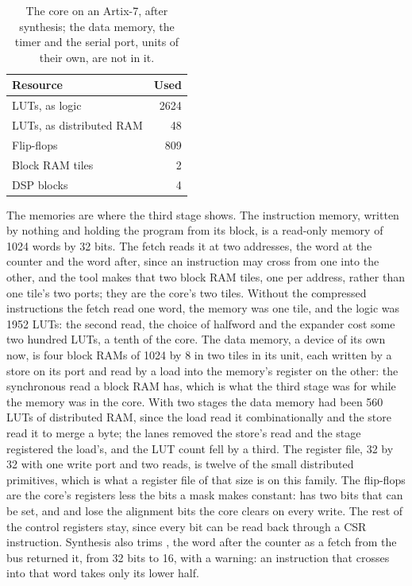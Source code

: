 \documentclass[journal,onecolumn,9pt]{IEEEtran}
\begin{document}
\begin{table}[htbp]
\caption{The core on an Artix-7, after synthesis; the data memory,
the timer and the serial port, units of their own, are not in it.}
\label{tab:v-synth}
\centering
\begin{tabular}{@{}lr@{}}
\toprule
Resource & Used \\
\midrule
LUTs, as logic & 2624 \\
LUTs, as distributed RAM & 48 \\
Flip-flops & 809 \\
Block RAM tiles & 2 \\
DSP blocks & 4 \\
\bottomrule
\end{tabular}
\end{table}

The memories are where the third stage shows. The instruction
memory, written by nothing and holding the program from its
 block, is a read-only memory of 1024 words by 32 bits.
The fetch reads it at two addresses, the word at the counter and the
word after, since an instruction may cross from one into the other,
and the tool makes that two block RAM tiles, one per address, rather
than one tile's two ports; they are the core's two tiles. Without the
compressed instructions the fetch read one word, the memory was one
tile, and the logic was 1952 LUTs: the second read, the choice of
halfword and the expander cost some two hundred LUTs, a tenth of the
core. The data memory, a
device of its own now, is four block RAMs of 1024 by 8 in two tiles
in its unit, each written by a store on its port and read by a load
into the memory's register on the other: the synchronous read a
block RAM has, which is what the third stage was for while the
memory was in the core. With two stages the data memory had been
560 LUTs of
distributed RAM, since the load read it combinationally and the
store read it to merge a byte; the lanes removed the store's read
and the stage registered the load's, and the LUT count fell by a
third. The register file, 32 by 32 with one write port and two
reads, is twelve of the small distributed primitives, which is what
a register file of that size is on this family. The flip-flops are
the core's registers less the bits a mask makes constant:  has two bits that
can be set, and  and  lose the alignment
bits the core clears on every write. The rest of the control
registers stay, since every bit can be read back through a CSR
instruction. Synthesis also
trims , the word after the counter as a fetch from the
bus returned it, from 32 bits to 16, with a warning: an instruction
that crosses into that word takes only its lower half.
\end{document}
